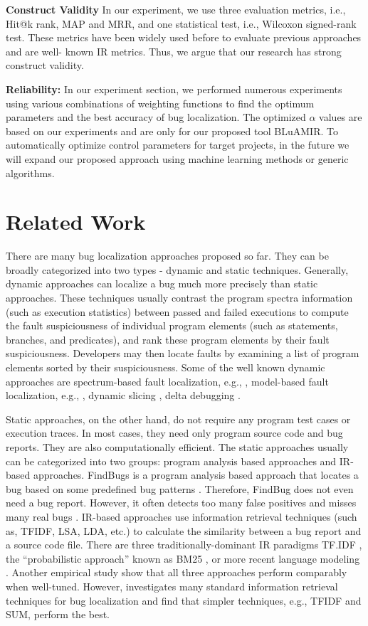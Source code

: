 \documentclass[conference]{IEEEtran}
\begin{document}
\textbf{Construct Validity}
In our experiment, we use three evaluation metrics, i.e., Hit@k rank, MAP and MRR, and one statistical test, i.e., Wilcoxon signed-rank test. These metrics have been widely used before to evaluate previous approaches \cite{Jian, Saha} and are well- known IR metrics. Thus, we argue that our research has strong construct validity.

\textbf{Reliability:}
In our experiment section, we performed numerous experiments using various combinations of weighting functions to find the optimum parameters and the best accuracy of bug localization. The optimized $\alpha$ values are based on our experiments and are only for our proposed tool BLuAMIR. To automatically optimize control parameters for target projects, in the future we will expand our proposed approach using machine learning methods or generic algorithms.

\section{Related Work}\label{relatedwork}
There are many bug localization approaches proposed so far. They can be broadly categorized into two types - dynamic and static techniques. Generally, dynamic approaches can localize a bug much more precisely than static approaches. These techniques usually contrast the program spectra information (such as execution statistics) between passed and failed executions to compute the fault suspiciousness of individual program elements (such as statements, branches, and predicates), and rank these program elements by their fault suspiciousness. Developers may then locate faults by examining a list of program elements sorted by their suspiciousness. Some of the well known dynamic approaches are spectrum-based fault localization, e.g., \cite{Abreu,Jones,Lucia,SahaFault}, model-based fault localization, e.g., \cite{Feldman,Mayer}, dynamic slicing \cite{Zhang:2005}, delta debugging \cite{Zeller:2002}. 

Static approaches, on the other hand, do not require any program test cases or execution traces. In most cases, they need only program source code and bug reports. They are also computationally efficient. The static approaches usually can be categorized into two groups: program analysis based approaches and IR-based approaches. FindBugs is a program analysis based approach that locates a bug based on some predefined bug patterns \cite{FindBug}. Therefore, FindBug does not even need a bug report. However, it often detects too many false positives and misses many real bugs \cite{Tang}. IR-based approaches use information retrieval techniques (such as, TFIDF, LSA, LDA, etc.) to calculate the similarity between a bug report and a source code file. There are three traditionally-dominant IR paradigms TF.IDF \cite{Salton}, the “probabilistic approach” known as BM25 \cite{Robertson}, or more recent language modeling \cite{Ponte}. Another empirical study \cite{Fang} show that all three approaches perform comparably when well-tuned. However, \citet{Rao} investigates many standard information retrieval techniques for bug localization and find that simpler techniques, e.g., TFIDF and SUM, perform the best. 
\end{document}
